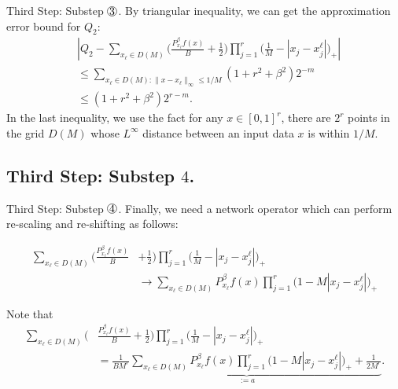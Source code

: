 \documentclass{if-beamer}
\newcommand*\circled[1]{\tikz[baseline=(char.base)]{
            \node[shape=circle,draw,inner sep=0.2pt] (char) {#1};}}
\begin{document}
\begin{frame}{Third Step: Substep $\circled{3}$.}
By triangular inequality, we can get the approximation error bound for $Q_2$:
\begin{align*}
    &\left| Q_{2} - \sum_{x_{\ell}\in D(M)}\bigg( \frac{P_{x_{\ell}}^{\beta}f(x)}{B}+\frac{1}{2}\bigg)\prod_{j=1}^{r}\bigg( \frac{1}{M} - |x_{j}-x_{j}^{\ell}| \bigg)_{+}  \right| \\
    &\leq \sum_{x_{\ell}\in D(M): \|x-x_{\ell}\|_{\infty}\leq 1/M} (1+r^{2}+\beta^{2}) 2^{-m} \\
    &\leq (1+r^{2}+\beta^{2}) 2^{r-m}.
\end{align*}
In the last inequality, we use the fact for any $x\in[0,1]^{r}$, there are $2^{r}$ points in the grid $D(M)$ whose $L^{\infty}$ distance between an input data $x$ is within $1/M$.
\end{frame}

\subsection{Third Step: Substep $4$.}
\begin{frame}{Third Step: Substep $\circled{4}$.}
Finally, we need a network operator which can perform re-scaling and re-shifting as follows:

\begin{align*}
    \sum_{x_{\ell}\in D(M)}\bigg( \frac{P_{x_{\ell}}^{\beta}f(x)}{B}&+\frac{1}{2}\bigg)\prod_{j=1}^{r}\bigg( \frac{1}{M} - |x_{j}-x_{j}^{\ell}| \bigg)_{+} \\
    &\rightarrow{\sum_{x_{\ell}\in D(M)} P_{x_{\ell}}^{\beta}f(x)\prod_{j=1}^{r}\bigg( 1 - M|x_{j}-x_{j}^{\ell}| \bigg)_{+}}
\end{align*}

Note that
\begin{align*}
    \sum_{x_{\ell}\in D(M)}\bigg( &\frac{P_{x_{\ell}}^{\beta}f(x)}{B}+\frac{1}{2}\bigg)\prod_{j=1}^{r}\bigg( \frac{1}{M} - |x_{j}-x_{j}^{\ell}| \bigg)_{+} \\
    &= \underbrace{\frac{1}{BM^{r}}\sum_{x_{\ell}\in D(M)} P_{x_{\ell}}^{\beta}f(x)\prod_{j=1}^{r}\bigg( 1 - M|x_{j}-x_{j}^{\ell}| \bigg)_{+}+\frac{1}{2M^{r}}}_{:=a}.
\end{align*}
\end{frame}
\end{document}

